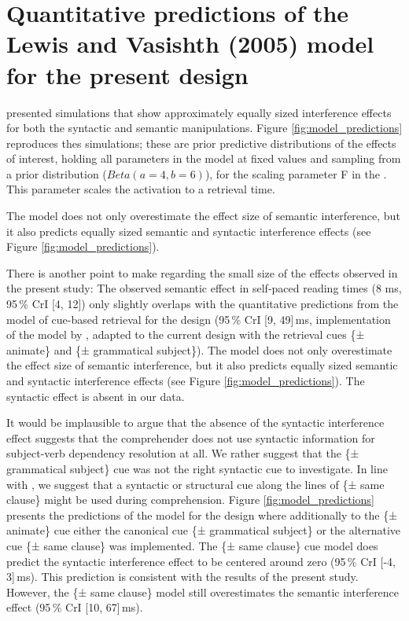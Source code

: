 \documentclass[a4paper, man, floatsintext]{apa7}
\begin{document}
\section{Quantitative predictions of the Lewis and Vasishth (2005) model for the present design}

 \cite{mertzen} presented simulations that show approximately equally sized interference effects 
for both the syntactic and semantic manipulations. Figure \ref{fig:model_predictions} reproduces thes simulations; these are prior predictive distributions of the effects of interest, holding all parameters in the model at fixed values and sampling from a prior distribution ($Beta(a=4,b=6)$), for the scaling parameter F in the \citet{Lewis2005}. This parameter scales the activation to a retrieval time.
 
The \citet{Lewis2005} model does not only overestimate the effect size of semantic interference, but it also predicts equally sized semantic and syntactic interference effects (see Figure \ref{fig:model_predictions}). 

There is another point to make regarding the small size of the effects observed in the present study: The observed semantic effect in self-paced reading times (8 ms, 95\,\% CrI [4, 12]) only slightly overlaps with the quantitative predictions from the \citet{Lewis2005} model of cue-based retrieval for the \citet{vandyke07} design (95\,\% CrI [9, 49]\,ms, implementation of the model by \cite{engelmann_etal_2019}, adapted to the current design with the retrieval cues \{± animate\} and \{± grammatical subject\}). The \citet{Lewis2005} model does not only overestimate the effect size of semantic interference, but it also predicts equally sized semantic and syntactic interference effects (see Figure \ref{fig:model_predictions}). The syntactic effect is absent in our data.

It would be implausible to argue that the absence of the syntactic interference effect suggests that the comprehender does not use syntactic information for subject-verb dependency resolution at all. We rather suggest that the \{± grammatical subject\} cue was not the right syntactic cue to investigate. In line with \citet{mertzen}, we suggest that a syntactic or structural cue along the lines of \{± same clause\} might be used during comprehension. Figure \ref{fig:model_predictions} presents the predictions of the \citet{Lewis2005} model for the \citet{vandyke07} design where additionally to the \{± animate\} cue either the canonical cue \{± grammatical subject\} or the alternative cue \{± same clause\} was implemented. The \{± same clause\} cue model does predict the syntactic interference effect to be centered around zero (95\,\% CrI [-4, 3]\,ms). This prediction is consistent with the results of the present study. However, the \{± same clause\} model still overestimates the semantic interference effect (95\,\% CrI [10, 67]\,ms).
\end{document}
